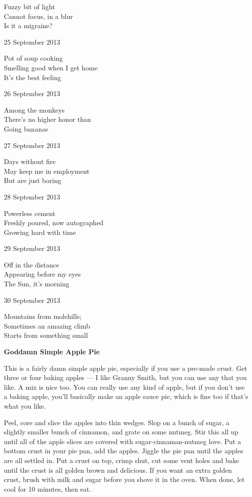 \documentclass[12pt]{article}
\begin{document}
Fuzzy bit of light \\
Cannot focus, in a blur \\
Is it a migraine?

25 September 2013

Pot of soup cooking \\
Smelling good when I get home \\
It's the best feeling

26 September 2013

Among the monkeys \\
There's no higher honor than \\
Going bananas

27 September 2013

Days without fire \\
May keep me in employment \\
But are just boring

28 September 2013

Powerless cement \\
Freshly poured, now autographed \\
Growing hard with time

29 September 2013

Off in the distance \\
Appearing before my eyes \\
The Sun, it's morning

30 September 2013

Mountains from molehills; \\
Sometimes an amazing climb \\
Starts from something small


\newpage

\begin{center}
    {\bfseries Goddamn Simple Apple Pie}
\end{center}

This is a fairly damn simple apple pie, especially if you use a pre-made crust. 
Get three or four baking apples --- I like Granny Smith, but you can use any 
that you like. A mix is nice too. You can really use any kind of apple, but
if you don't use a baking apple, you'll basically make an apple sauce pie, which
is fine too if that's what you like.

Peel, core and slice the apples into thin wedges. Slop on a bunch of sugar, a slightly
smaller bunch of cinnamon, and grate on some nutmeg. Stir this all up until all of
the apple slices are covered with sugar-cinnaman-nutmeg love. Put a bottom crust in
your pie pan, add the apples. Jiggle the pie pan until the apples are all settled in.
Put a crust on top, crimp shut, cut some vent holes and bake until the crust is all
golden brown and delicious. If you want an extra golden crust, brush with milk and 
sugar before you shove it in the oven. When done, let cool for 10 minutes, then eat.
\end{document}
